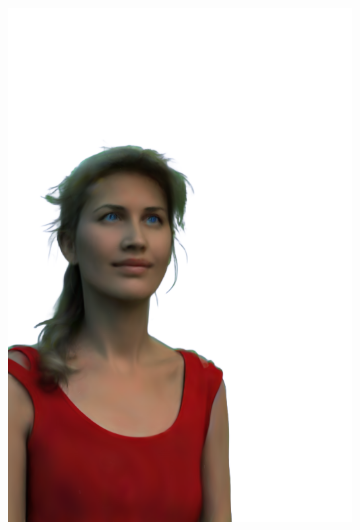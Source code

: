 \begin{figure}[ht]
\begin{subfigure}{0.08\linewidth}
        \includegraphics[width=\textwidth]{Figures/results/high/dora_3d/11_render.png}

\end{subfigure}
\end{figure}
